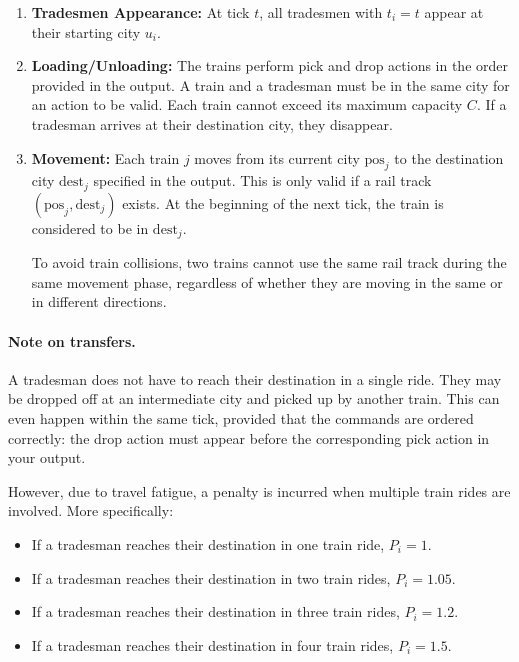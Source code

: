 \documentclass[11pt]{article}
\begin{document}
\begin{enumerate}
    \item \textbf{Tradesmen Appearance:} At tick $t$, all tradesmen with $t_i = t$ appear at their starting city $u_i$.
    
    \item \textbf{Loading/Unloading:} The trains perform pick and drop actions in the order provided in the output. A train and a tradesman must be in the same city for an action to be valid. Each train cannot exceed its maximum capacity $C$. If a tradesman arrives at their destination city, they disappear.
    
    \item \textbf{Movement:} Each train $j$ moves from its current city $\mathrm{pos}_j$ to the destination city $\mathrm{dest}_j$ specified in the output. This is only valid if a rail track $(\mathrm{pos}_j,\mathrm{dest}_j)$ exists. At the beginning of the next tick, the train is considered to be in $\mathrm{dest}_j$.
    
    To avoid train collisions, two trains cannot use the same rail track during the same movement phase, regardless of whether they are moving in the same or in different directions.
\end{enumerate}

\paragraph{Note on transfers.}
A tradesman does not have to reach their destination in a single ride. They may be dropped off at an intermediate city and picked up by another train. This can even happen within the same tick, provided that the commands are ordered correctly: the drop action must appear before the corresponding pick action in your output.

However, due to travel fatigue, a penalty is incurred when multiple train rides are involved. More specifically:
\begin{itemize}
    \item If a tradesman reaches their destination in one train ride, $P_i = 1$.
    \item If a tradesman reaches their destination in two train rides, $P_i = 1.05$.
    \item If a tradesman reaches their destination in three train rides, $P_i = 1.2$.
    \item If a tradesman reaches their destination in four train rides, $P_i = 1.5$.
\end{itemize}
\end{document}
